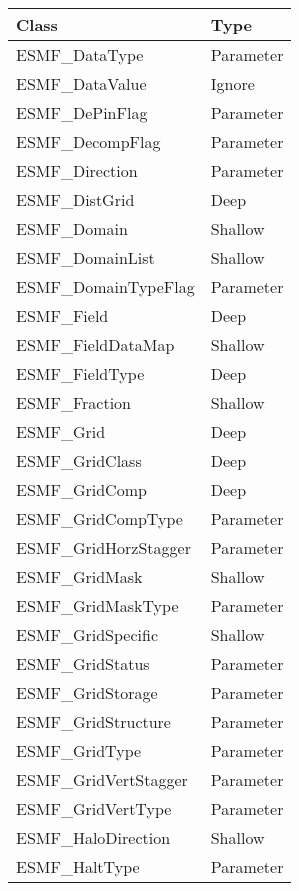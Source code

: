 \begin{table}[t]
\begin{tabular}{ll}

{\bf Class} & {\bf Type} \\ \hline

ESMF\_DataType              & Parameter \\
ESMF\_DataValue             & Ignore\\
ESMF\_DePinFlag             & Parameter \\
ESMF\_DecompFlag            & Parameter \\
ESMF\_Direction             & Parameter \\
ESMF\_DistGrid              & Deep \\
ESMF\_Domain                & Shallow\\
ESMF\_DomainList            & Shallow\\
ESMF\_DomainTypeFlag        & Parameter \\
ESMF\_Field                 & Deep \\
ESMF\_FieldDataMap          & Shallow\\
ESMF\_FieldType             & Deep \\
ESMF\_Fraction              & Shallow\\
ESMF\_Grid                  & Deep \\
ESMF\_GridClass             & Deep \\
ESMF\_GridComp              & Deep \\
ESMF\_GridCompType          & Parameter \\
ESMF\_GridHorzStagger       & Parameter \\
ESMF\_GridMask              & Shallow\\
ESMF\_GridMaskType          & Parameter \\
ESMF\_GridSpecific          & Shallow\\
ESMF\_GridStatus            & Parameter \\
ESMF\_GridStorage           & Parameter \\
ESMF\_GridStructure         & Parameter \\
ESMF\_GridType              & Parameter \\
ESMF\_GridVertStagger       & Parameter \\
ESMF\_GridVertType          & Parameter \\
ESMF\_HaloDirection         & Shallow\\
ESMF\_HaltType              & Parameter \\

\end{tabular}
\end{table}
